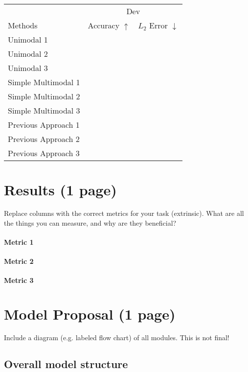 \documentclass[11pt,a4paper]{article}
\begin{document}
\clearpage
\begin{table}[t]
\centering
\begin{tabular}{@{}lrr@{}}
\toprule
                            & \multicolumn{2}{c}{Dev} \\
Methods                     & Accuracy $\uparrow$ & $L_2$ Error $\downarrow$  \\
\midrule
Unimodal 1 \cite{} & & \\
Unimodal 2 \cite{} & & \\
Unimodal 3 \cite{} & & \\
\midrule
Simple Multimodal 1 \cite{} & & \\
Simple Multimodal 2 \cite{} & & \\
Simple Multimodal 3 \cite{} & & \\
\midrule
Previous Approach 1 \cite{} & & \\
Previous Approach 2 \cite{} & & \\
Previous Approach 3 \cite{} & & \\
\bottomrule
\end{tabular}
\end{table}
\section{Results (1 page)}
Replace columns with the correct metrics for your task (extrinsic). What are 
all the things you can measure, and why are they beneficial?
\paragraph{Metric 1}

\paragraph{Metric 2}

\paragraph{Metric 3}


\clearpage
\section{Model Proposal (1 page)}
Include a diagram (e.g. labeled flow chart) of all modules.  This is not final!

\subsection{Overall model structure}
\end{document}

